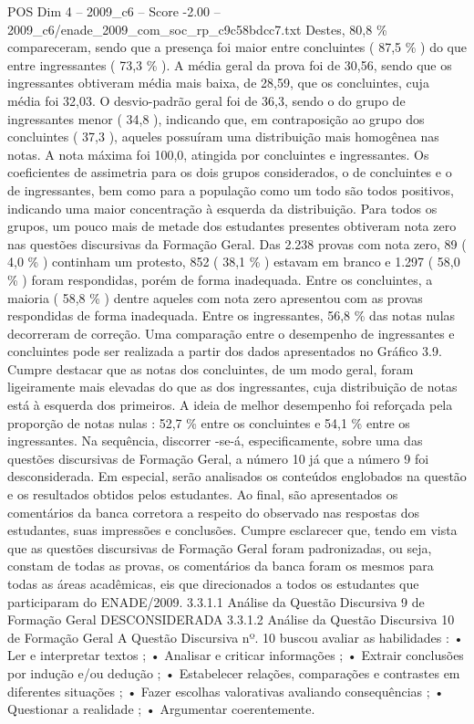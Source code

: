 \begin{textsample}{POS Dim 4 – 2009\_c6 – Score -2.00 – 2009\_c6/enade\_2009\_com\_soc\_rp\_c9c58bdcc7.txt}
Destes, 80,8 \% compareceram, sendo que a presença foi maior entre concluintes ( 87,5 \% ) do que entre ingressantes ( 73,3 \% ).
A média geral da prova foi de 30,56, sendo que os ingressantes obtiveram média mais baixa, de 28,59, que os concluintes, cuja média foi 32,03.
O desvio-padrão geral foi de 36,3, sendo o do grupo de ingressantes menor ( 34,8 ), indicando que, em contraposição ao grupo dos concluintes ( 37,3 ), aqueles possuíram uma distribuição mais homogênea nas notas.
A nota máxima foi 100,0, atingida por concluintes e ingressantes.
Os coeficientes de assimetria para os dois grupos considerados, o de concluintes e o de ingressantes, bem como para a população como um todo são todos positivos, indicando uma maior concentração à esquerda da distribuição.
Para todos os grupos, um pouco mais de metade dos estudantes presentes obtiveram nota zero nas questões discursivas da Formação Geral.
Das 2.238 provas com nota zero, 89 ( 4,0 \% ) continham um protesto, 852 ( 38,1 \% ) estavam em branco e 1.297 ( 58,0 \% ) foram respondidas, porém de forma inadequada.
Entre os concluintes, a maioria ( 58,8 \% ) dentre aqueles com nota zero apresentou com as provas respondidas de forma inadequada.
Entre os ingressantes, 56,8 \% das notas nulas decorreram de correção.
Uma comparação entre o desempenho de ingressantes e concluintes pode ser realizada a partir dos dados apresentados no Gráfico 3.9.
Cumpre destacar que as notas dos concluintes, de um modo geral, foram ligeiramente mais elevadas do que as dos ingressantes, cuja distribuição de notas está à esquerda dos primeiros.
A ideia de melhor desempenho foi reforçada pela proporção de notas nulas : 52,7 \% entre os concluintes e 54,1 \% entre os ingressantes.
Na sequência, discorrer -se-á, especificamente, sobre uma das questões discursivas de Formação Geral, a número 10 já que a número 9 foi desconsiderada.
Em especial, serão analisados os conteúdos englobados na questão e os resultados obtidos pelos estudantes.
Ao final, são apresentados os comentários da banca corretora a respeito do observado nas respostas dos estudantes, suas impressões e conclusões.
Cumpre esclarecer que, tendo em vista que as questões discursivas de Formação Geral foram padronizadas, ou seja, constam de todas as provas, os comentários da banca foram os mesmos para todas as áreas acadêmicas, eis que direcionados a todos os estudantes que participaram do ENADE/2009. 3.3.1.1 Análise da Questão Discursiva 9 de Formação Geral DESCONSIDERADA 3.3.1.2 Análise da Questão Discursiva 10 de Formação Geral A Questão Discursiva nº. 10 buscou avaliar as habilidades : • Ler e interpretar textos ; • Analisar e criticar informações ; • Extrair conclusões por indução e/ou dedução ; • Estabelecer relações, comparações e contrastes em diferentes situações ; • Fazer escolhas valorativas avaliando consequências ; • Questionar a realidade ; • Argumentar coerentemente.

\end{textsample}
